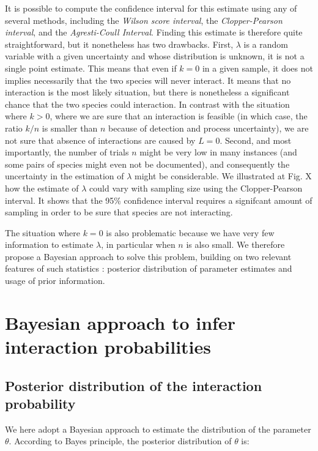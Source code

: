 \documentclass[12pt]{article}
\begin{document}
It is possible to compute the confidence interval for this estimate using any of several methods, including the \emph{Wilson score interval}, the \emph{Clopper-Pearson interval}, and the \emph{Agresti-Coull Interval}. Finding this estimate is therefore quite straightforward, but it nonetheless has two drawbacks. First, $\lambda$ is a random variable with a given uncertainty and whose distribution is unknown, it is not a single point estimate. This means that even if $k = 0$ in a given sample, it does not implies necessarily that the two species will never interact. It means that no interaction is the most likely situation, but there is nonetheless a significant chance that the two species could interaction. In contrast with the situation where $k>0$, where we are sure that an interaction is feasible (in which case, the ratio $k/n$ is smaller than $n$ because of detection and process uncertainty), we are not sure that absence of interactions are caused by $L=0$. Second, and most importantly, the number of trials $n$ might be very low in many instances (and some pairs of species might even not be documented), and consequently the uncertainty in the estimation of $\lambda$ might be considerable. We illustrated at Fig. X how the estimate of $\lambda$ could vary with sampling size using the Clopper-Pearson interval. It shows that the 95\% confidence interval requires a signifcant amount of sampling in order to be sure that species are not interacting. 

The situation where $k = 0$ is also problematic because we have very few information to estimate $\lambda$, in particular when $n$ is also small. We therefore propose a Bayesian approach to solve this problem, building on two relevant features of such statistics : posterior distribution of parameter estimates and usage of prior information. 

 \section*{Bayesian approach to infer interaction probabilities}

    \subsection*{Posterior distribution of the interaction probability}

  We here adopt a Bayesian approach to estimate the distribution of the parameter $\theta$. According to Bayes principle, the posterior distribution of $\theta$ is:
\end{document}
